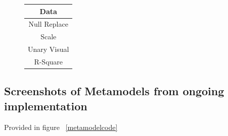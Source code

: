\begin{figure} [!htb]
\begin{tabular}{|c|}
\hline
Data\\
\hline
Null Replace\\
\hline
Scale\\
\hline
Unary Visual\\
\hline
R-Square\\
\hline
\end{tabular}
\end{figure}

\vspace{1in}

\subsection{Screenshots of Metamodels from ongoing implementation}
Provided in figure ~\ref{metamodelcode}
